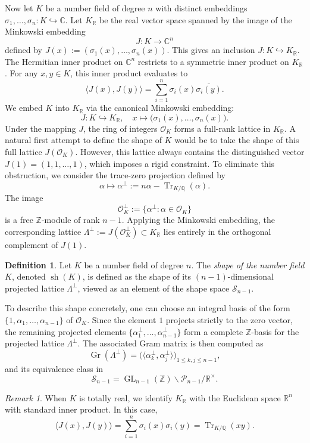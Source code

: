 \documentclass{amsart}
\newcommand{\Q}{\mathbb{Q}}
\newcommand{\op}[1]{\operatorname{#1}}
\theoremstyle{plain}
\theoremstyle{definition}
\newtheorem{definition}[theorem]{Definition}
\theoremstyle{remark}
\newtheorem{remark}[theorem]{Remark}
\numberwithin{equation}{section}
\begin{document}
\par Now let $K$ be a number field of degree $n$ with distinct embeddings $\sigma_1, \dots, \sigma_n : K \hookrightarrow \mathbb{C}$. Let $K_{\mathbb{R}}$ be the real vector space spanned by the image of the Minkowski embedding
\[J: K\rightarrow \mathbb C^n\] defined by $J(x):=(\sigma_1(x), \dots, \sigma_n(x))$. This gives an inclusion $J: K\hookrightarrow K_{\mathbb{R}}$. The Hermitian inner product on $\mathbb{C}^n$ restricts to a symmetric inner product on $K_{\mathbb{R}}$. For any $x, y \in K$, this inner product evaluates to
\[
    \langle J(x), J(y) \rangle = \sum_{i=1}^n \sigma_i(x)\overline{\sigma_i(y)}.
\]
We embed $K$ into $K_{\mathbb{R}}$ via the canonical Minkowski embedding:
\[
    J : K \hookrightarrow K_{\mathbb{R}}, \quad x \mapsto \bigl(\sigma_1(x), \ldots, \sigma_n(x)\bigr).
\]
Under the mapping $J$, the ring of integers $\mathcal{O}_K$ forms a full-rank lattice in $K_{\mathbb{R}}$. A natural first attempt to define the shape of $K$ would be to take the shape of this full lattice $J(\mathcal{O}_K)$. However, this lattice always contains the distinguished vector $J(1) = (1, 1, \dots, 1)$, which imposes a rigid constraint. To eliminate this obstruction, we consider the trace-zero projection defined by
\[
    \alpha \longmapsto \alpha^\perp := n\alpha - \operatorname{Tr}_{K/\mathbb{Q}}(\alpha).
\]
The image
\[
    \mathcal{O}_K^\perp := \{\alpha^\perp : \alpha \in \mathcal{O}_K\}
\]
is a free $\mathbb{Z}$-module of rank $n-1$. Applying the Minkowski embedding, the corresponding lattice $\Lambda^\perp := J(\mathcal{O}_K^\perp) \subset K_{\mathbb{R}}$ lies entirely in the orthogonal complement of $J(1)$.
\begin{definition}
    Let $K$ be a number field of degree $n$. The \emph{shape of the number field} $K$, denoted $\operatorname{sh}(K)$, is defined as the shape of its $(n-1)$-dimensional projected lattice $\Lambda^\perp$, viewed as an element of the shape space $\mathcal{S}_{n-1}$.
\end{definition}
\noindent To describe this shape concretely, one can choose an integral basis of the form
$\{1, \alpha_1, \dots, \alpha_{n-1}\}$
of $\mathcal{O}_K$. Since the element $1$ projects strictly to the zero vector, the remaining projected elements $
    \{\alpha_1^\perp, \dots, \alpha_{n-1}^\perp\}$
form a complete $\mathbb{Z}$-basis for the projected lattice $\Lambda^\perp$. The associated Gram matrix is then computed as
\[
    \operatorname{Gr}(\Lambda^\perp) = \bigl( \langle \alpha_k^\perp, \alpha_j^\perp \rangle \bigr)_{1 \le k, j \le n-1},
\]
and its equivalence class in
\[
    \mathcal{S}_{n-1} = \operatorname{GL}_{n-1}(\mathbb{Z}) \backslash \mathcal{P}_{n-1} / \mathbb{R}^\times.
\]
\begin{remark}When $K$ is totally real, we identify $K_{\mathbb R}$ with the Euclidean space $\mathbb R^n$ with standard inner product. In this case, 
\[\langle J(x), J(y)\rangle=\sum_{i=1}^n \sigma_i(x) \sigma_i(y)=\op{Tr}_{K/\Q}(xy).\]
\end{remark}
\end{document}
